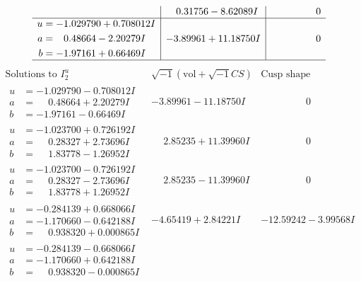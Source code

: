 \documentclass[1p]{elsarticle_modified}
\theoremstyle{definition}
\newcommand{\I}{\sqrt{-1}}
\begin{document}
$$\begin{array}{c|c|c}
 & \phantom{-}0.31756 - 8.62089 I & \phantom{-0.000000 } 0 \\ \hline\begin{aligned}
u &= -1.029790 + 0.708012 I \\
a &= \phantom{-}0.48664 - 2.20279 I \\
b &= -1.97161 + 0.66469 I\end{aligned}
 & -3.89961 + 11.18750 I & \phantom{-0.000000 } 0\\
 \hline 
 \end{array}$$\newpage$$\begin{array}{c|c|c}  
\text{Solutions to }I^u_{2}& \I (\text{vol} + \sqrt{-1}CS) & \text{Cusp shape}\\
 \hline 
\begin{aligned}
u &= -1.029790 - 0.708012 I \\
a &= \phantom{-}0.48664 + 2.20279 I \\
b &= -1.97161 - 0.66469 I\end{aligned}
 & -3.89961 - 11.18750 I & \phantom{-0.000000 } 0 \\ \hline\begin{aligned}
u &= -1.023700 + 0.726192 I \\
a &= \phantom{-}0.28327 + 2.73696 I \\
b &= \phantom{-}1.83778 - 1.26952 I\end{aligned}
 & \phantom{-}2.85235 + 11.39960 I & \phantom{-0.000000 } 0 \\ \hline\begin{aligned}
u &= -1.023700 - 0.726192 I \\
a &= \phantom{-}0.28327 - 2.73696 I \\
b &= \phantom{-}1.83778 + 1.26952 I\end{aligned}
 & \phantom{-}2.85235 - 11.39960 I & \phantom{-0.000000 } 0 \\ \hline\begin{aligned}
u &= -0.284139 + 0.668066 I \\
a &= -1.170660 - 0.642188 I \\
b &= \phantom{-}0.938320 + 0.000865 I\end{aligned}
 & -4.65419 + 2.84221 I & -12.59242 - 3.99568 I \\ \hline\begin{aligned}
u &= -0.284139 - 0.668066 I \\
a &= -1.170660 + 0.642188 I \\
b &= \phantom{-}0.938320 - 0.000865 I\end{aligned}

\end{array}$$
\end{document}
